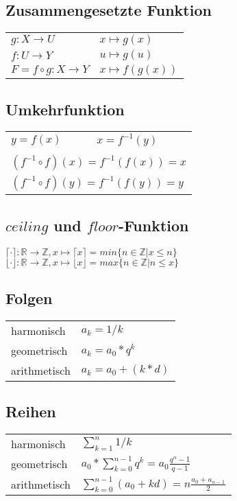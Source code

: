\subsection{Zusammengesetzte Funktion}
\begin{tabular}{ll}
    $ g: X \rightarrow U $ & $ x \mapsto g(x) $ \\
    $ f: U \rightarrow Y $ & $ u \mapsto g(u) $ \\
    $ F = f \circ g: X \rightarrow Y $ & $ x \mapsto f(g(x)) $ \\
\end{tabular} 

\subsection{Umkehrfunktion}
\begin{tabular}{ll}
    $ y = f(x) $ & $ x = f^{-1}(y) $ \\
    & \\
    \multicolumn{2}{l}{$ (f^{-1} \circ f)(x) = f^{-1}(f(x)) = x $} \\
    \multicolumn{2}{l}{$ (f^{-1} \circ f)(y) = f^{-1}(f(y)) = y $} \\
\end{tabular} 

\subsection{$ceiling$ und $floor$-Funktion}
$ \lceil \cdot \rceil : \mathbb{R} \rightarrow \mathbb{Z}, x \mapsto \lceil x \rceil = min \{n \in \mathbb{Z} | x \leq n \} $ \\
$ \lfloor \cdot \rfloor : \mathbb{R} \rightarrow \mathbb{Z}, x \mapsto \lfloor x \rfloor = max \{n \in \mathbb{Z} | n \leq x \} $


\subsection{Folgen}
\begin{tabular}{ll}
    harmonisch & $ a_k = 1 / k $ \\
    geometrisch & $ a_k = a_0 * q^k $ \\
    arithmetisch & $ a_k = a_0 + (k*d) $ \\
\end{tabular} 

\subsection{Reihen}
\begin{tabular}{ll}
    harmonisch & $ \sum_{k=1}^n 1 / k $ \\
    geometrisch & $ a_0 * \sum_{k=0}^{n-1} q^k = a_0 \frac{q^n - 1}{q - 1}$ \\
    arithmetisch & $ \sum_{k=0}^{n-1} (a_0 + kd) = n \frac{a_0 + a_{n-1}}{2}$ \\
\end{tabular} 

